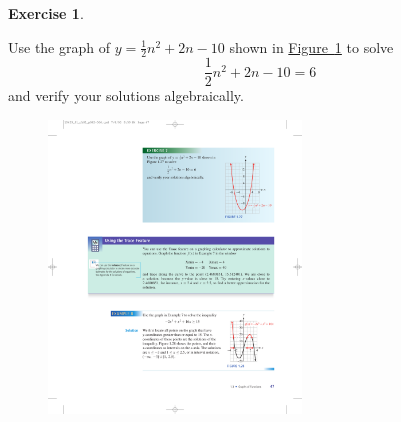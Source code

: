 \documentclass[10pt,]{book}
\theoremstyle{plain}
\theoremstyle{definition}
\theoremstyle{definition}
\theoremstyle{definition}
\theoremstyle{definition}
\newtheorem{exercise}[theorem]{Exercise}
\numberwithin{equation}{section}
\begin{document}
\begin{exercise}\label{exercise-graph-to-solve-quadratic}

    Use the graph of \(y = \frac{1}{2}n^2 + 2n − 10\) shown in \hyperref[fig-graph-to-solve-quadratic]{Figure~\ref{fig-graph-to-solve-quadratic}} to solve
    \begin{equation*}\frac{1}{2}n^2 + 2n − 10 = 6\end{equation*}
    and verify your solutions algebraically.
\leavevmode%
\begin{figure}
\centering
\includegraphics[width=0.60\textwidth,]{images/fig-graph-to-solve-quadratic.pdf}\caption{\label{fig-graph-to-solve-quadratic}}
\end{figure}
\end{exercise}
\end{document}

